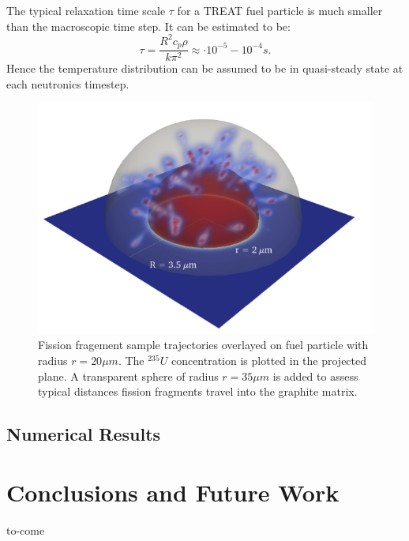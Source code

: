 \documentclass{anstrans}
\begin{document}
The typical relaxation time scale $\tau$ for a TREAT fuel particle is much smaller than the macroscopic time step. It can be estimated to be:
\begin{equation}
   \tau = \frac{R^2 c_p \rho}{k \pi^2} \approx  \cdot 10^{-5}-10^{-4} s.
\end{equation}
Hence the temperature distribution can be assumed to be in quasi-steady state at each neutronics timestep. 

\begin{figure}[t] %
  \centering
  \includegraphics[scale=0.6]{./figures/radiation_damage_radius.png}
  \caption{Fission fragement sample trajectories overlayed on fuel particle with radius $r=20 \mu m$. The $^{235}U$ concentration is plotted in the projected plane. A transparent sphere of radius $r=35 \mu m$ is added to assess typical distances fission fragments travel into the graphite matrix. \label{fig:radiation_damage_radius}}
\end{figure}

\subsection{Numerical Results}


\section{Conclusions and Future Work}
to-come

\end{document}
